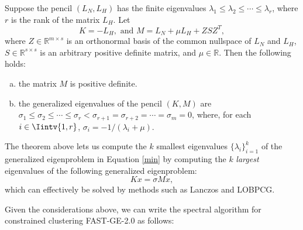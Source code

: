 \begin{theorem}
   Suppose the pencil $(L_N, L_H)$ has the finite eigenvalues $\lambda_1 \le \lambda_2 \le \cdots \le \lambda_r$, where $r$ is the rank of the matrix $L_H$. Let
   \begin{equation}\label{regularization}
      K = - L_H,  \text{ and } M = L_N + \mu L_H + ZSZ^T,
   \end{equation}
   where $Z \in \mathbb R^{m \times s}$ is an orthonormal basis of the common nullspace of $L_N$ and $L_H$, $S \in \mathbb R ^{s \times s}$ is an arbitrary positive definite matrix, and $\mu \in \mathbb R$.
   Then the following holds:
   \begin{enumerate}[(a)]
      \item the matrix $M$ is positive definite.
      \item the generalized eigenvalues of the pencil $(K, M)$ are $\sigma _1 \le \sigma_2 \le \cdots \le \sigma_r < \sigma_{r+1} = \sigma_{r+2} = \cdots = \sigma_m = 0$, where, for each $i \in \Iintv{1,r}$, $\sigma_i = -1/(\lambda_i + \mu)$.
   \end{enumerate}
\end{theorem}

The theorem above lets us compute the $k$ smallest eigenvalues $\{ \lambda_i \}_{i=1}^k$ of the generalized eigenproblem in Equation \vref{min} by computing the $k$ \textit{largest} eigenvalues of the following generalized eigenproblem:
\begin{equation}
K x = \sigma M x,
\end{equation}
which can effectively be solved by methods such as Lanczos and LOBPCG.

Given the considerations above, we can write the spectral algorithm for constrained clustering FAST-GE-2.0 as follows:

